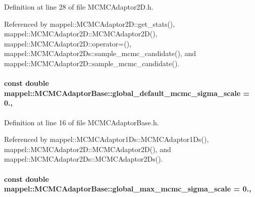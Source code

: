 Definition at line 28 of file M\+C\+M\+C\+Adaptor2\+D.\+h.



Referenced by mappel\+::\+M\+C\+M\+C\+Adaptor2\+D\+::get\+\_\+stats(), mappel\+::\+M\+C\+M\+C\+Adaptor2\+D\+::\+M\+C\+M\+C\+Adaptor2\+D(), mappel\+::\+M\+C\+M\+C\+Adaptor2\+D\+::operator=(), mappel\+::\+M\+C\+M\+C\+Adaptor2\+Ds\+::sample\+\_\+mcmc\+\_\+candidate(), and mappel\+::\+M\+C\+M\+C\+Adaptor2\+D\+::sample\+\_\+mcmc\+\_\+candidate().

\paragraph[{\texorpdfstring{global\+\_\+default\+\_\+mcmc\+\_\+sigma\+\_\+scale}{global_default_mcmc_sigma_scale}}]{\setlength{\rightskip}{0pt plus 5cm}const double mappel\+::\+M\+C\+M\+C\+Adaptor\+Base\+::global\+\_\+default\+\_\+mcmc\+\_\+sigma\+\_\+scale = 0.\hspace{0.3cm}{\ttfamily [static]}, {\ttfamily [inherited]}}\hypertarget{classmappel_1_1MCMCAdaptorBase_a44cebca0e27135c854fa8430d2d89929}{}\label{classmappel_1_1MCMCAdaptorBase_a44cebca0e27135c854fa8430d2d89929}


Definition at line 16 of file M\+C\+M\+C\+Adaptor\+Base.\+h.



Referenced by mappel\+::\+M\+C\+M\+C\+Adaptor1\+Ds\+::\+M\+C\+M\+C\+Adaptor1\+Ds(), mappel\+::\+M\+C\+M\+C\+Adaptor2\+D\+::\+M\+C\+M\+C\+Adaptor2\+D(), and mappel\+::\+M\+C\+M\+C\+Adaptor2\+Ds\+::\+M\+C\+M\+C\+Adaptor2\+Ds().

\paragraph[{\texorpdfstring{global\+\_\+max\+\_\+mcmc\+\_\+sigma\+\_\+scale}{global_max_mcmc_sigma_scale}}]{\setlength{\rightskip}{0pt plus 5cm}const double mappel\+::\+M\+C\+M\+C\+Adaptor\+Base\+::global\+\_\+max\+\_\+mcmc\+\_\+sigma\+\_\+scale = 0.\hspace{0.3cm}{\ttfamily [static]}, {\ttfamily [inherited]}}\hypertarget{classmappel_1_1MCMCAdaptorBase_aebc93881ca351e67de867238a62579eb}{}\label{classmappel_1_1MCMCAdaptorBase_aebc93881ca351e67de867238a62579eb}



